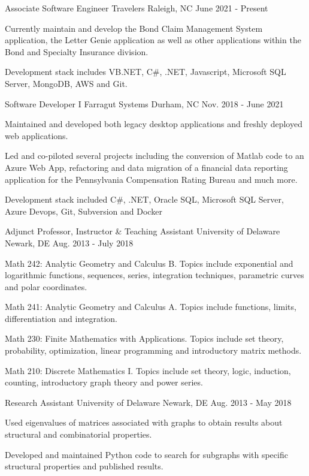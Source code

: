 \begin{cventries}
  \cventry
    {Associate Software Engineer}
    {Travelers}
    {Raleigh, NC}
    {June 2021 - Present}
    {
      \begin{cvitems}
        \item {Currently maintain and develop the Bond Claim Management System application, the Letter Genie application as well as other applications within the Bond and Specialty Insurance division.}
        \item {Development stack includes VB.NET, C\#, .NET, Javascript, Microsoft SQL Server, MongoDB, AWS and Git.}
      \end{cvitems}
    }
  \cventry
    {Software Developer I}
    {Farragut Systems}
    {Durham, NC}
    {Nov. 2018 - June 2021}
    {
      \begin{cvitems}
        \item {Maintained and developed both legacy desktop applications and freshly deployed web applications.}
        \item {Led and co-piloted several projects including the conversion of Matlab code to an Azure Web App, refactoring and data migration of a financial data reporting application for the Pennsylvania Compensation Rating Bureau and much more.}
        \item {Development stack included C\#, .NET, Oracle SQL, Microsoft SQL Server, Azure Devops, Git, Subversion and Docker}
      \end{cvitems}
    }
  \cventry
    {Adjunct Professor, Instructor \& Teaching Assistant}
    {University of Delaware}
    {Newark, DE}
    {Aug. 2013 - July 2018}
    {
      \begin{cvitems}
        \item {Math 242: Analytic Geometry and Calculus B. Topics include exponential and logarithmic functions, sequences, series, integration techniques, parametric curves and polar coordinates.}
        \item {Math 241: Analytic Geometry and Calculus A. Topics include functions, limits, differentiation and integration.}
        \item {Math 230: Finite Mathematics with Applications. Topics include set theory, probability, optimization, linear programming and introductory matrix methods.}
        \item {Math 210: Discrete Mathematics I. Topics include set theory, logic, induction, counting, introductory graph theory and power series.}
      \end{cvitems}
    }
  \cventry
    {Research Assistant}
    {University of Delaware}
    {Newark, DE}
    {Aug. 2013 - May 2018}
    {
      \begin{cvitems}
        \item {Used eigenvalues of matrices associated with graphs to obtain results about structural and combinatorial properties.}
        \item{Developed and maintained Python code to search for subgraphs with specific structural properties and published results.}
      \end{cvitems}
    }
\end{cventries}
\vspace*{-2pt}
